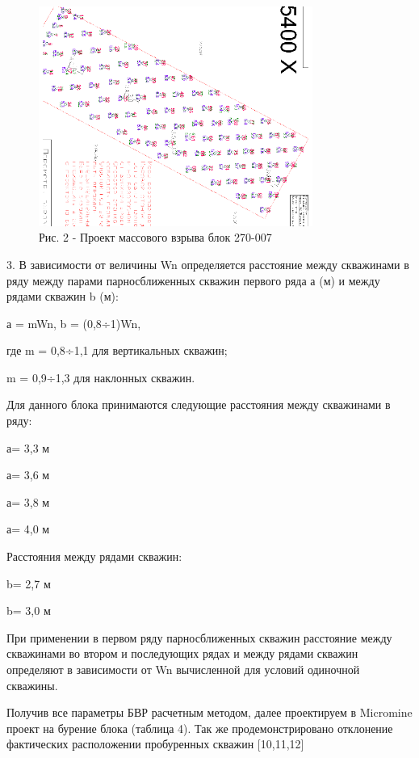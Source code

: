 \begin{figure}[H]
	\centering
	\includegraphics[width=0.8\textwidth]{media/gor/image29}
	\caption*{Рис. 2 - Проект массового взрыва блок 270-007}
\end{figure}

\begin{multicols}{2}
3. В зависимости от величины Wn определяется расстояние между скважинами
в ряду между парами парносближенных скважин первого ряда а (м) и между
рядами скважин b (м):

а = mWn, b = (0,8÷1)Wn,

где m = 0,8÷1,1 для вертикальных скважин;

m = 0,9÷1,3 для наклонных скважин.

Для данного блока принимаются следующие расстояния между скважинами в
ряду:

а= 3,3 м

а= 3,6 м

а= 3,8 м

а= 4,0 м

Расстояния между рядами скважин:

b= 2,7 м

b= 3,0 м

При применении в первом ряду парносближенных скважин расстояние между
скважинами во втором и последующих рядах и между рядами скважин
определяют в зависимости от Wn вычисленной для условий одиночной
скважины.

Получив все параметры БВР расчетным методом, далее проектируем в
Micromine проект на бурение блока (таблица 4). Так же продемонстрировано
отклонение фактических расположении пробуренных скважин {[}10,11,12{]}
\end{multicols}

